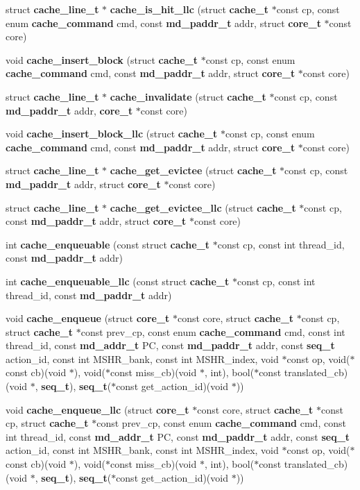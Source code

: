 \begin{CompactItemize}
\item 
struct {\bf cache\_\-line\_\-t} $\ast$ {\bf cache\_\-is\_\-hit\_\-llc} (struct {\bf cache\_\-t} $\ast$const cp, const enum {\bf cache\_\-command} cmd, const {\bf md\_\-paddr\_\-t} addr, struct {\bf core\_\-t} $\ast$const core)
\item 
void {\bf cache\_\-insert\_\-block} (struct {\bf cache\_\-t} $\ast$const cp, const enum {\bf cache\_\-command} cmd, const {\bf md\_\-paddr\_\-t} addr, struct {\bf core\_\-t} $\ast$const core)
\item 
struct {\bf cache\_\-line\_\-t} $\ast$ {\bf cache\_\-invalidate} (struct {\bf cache\_\-t} $\ast$const cp, const {\bf md\_\-paddr\_\-t} addr, {\bf core\_\-t} $\ast$const core)
\item 
void {\bf cache\_\-insert\_\-block\_\-llc} (struct {\bf cache\_\-t} $\ast$const cp, const enum {\bf cache\_\-command} cmd, const {\bf md\_\-paddr\_\-t} addr, struct {\bf core\_\-t} $\ast$const core)
\item 
struct {\bf cache\_\-line\_\-t} $\ast$ {\bf cache\_\-get\_\-evictee} (struct {\bf cache\_\-t} $\ast$const cp, const {\bf md\_\-paddr\_\-t} addr, struct {\bf core\_\-t} $\ast$const core)
\item 
struct {\bf cache\_\-line\_\-t} $\ast$ {\bf cache\_\-get\_\-evictee\_\-llc} (struct {\bf cache\_\-t} $\ast$const cp, const {\bf md\_\-paddr\_\-t} addr, struct {\bf core\_\-t} $\ast$const core)
\item 
int {\bf cache\_\-enqueuable} (const struct {\bf cache\_\-t} $\ast$const cp, const int thread\_\-id, const {\bf md\_\-paddr\_\-t} addr)
\item 
int {\bf cache\_\-enqueuable\_\-llc} (const struct {\bf cache\_\-t} $\ast$const cp, const int thread\_\-id, const {\bf md\_\-paddr\_\-t} addr)
\item 
void {\bf cache\_\-enqueue} (struct {\bf core\_\-t} $\ast$const core, struct {\bf cache\_\-t} $\ast$const cp, struct {\bf cache\_\-t} $\ast$const prev\_\-cp, const enum {\bf cache\_\-command} cmd, const int thread\_\-id, const {\bf md\_\-addr\_\-t} PC, const {\bf md\_\-paddr\_\-t} addr, const {\bf seq\_\-t} action\_\-id, const int MSHR\_\-bank, const int MSHR\_\-index, void $\ast$const op, void($\ast$const cb)(void $\ast$), void($\ast$const miss\_\-cb)(void $\ast$, int), bool($\ast$const translated\_\-cb)(void $\ast$, {\bf seq\_\-t}), {\bf seq\_\-t}($\ast$const get\_\-action\_\-id)(void $\ast$))
\item 
void {\bf cache\_\-enqueue\_\-llc} (struct {\bf core\_\-t} $\ast$const core, struct {\bf cache\_\-t} $\ast$const cp, struct {\bf cache\_\-t} $\ast$const prev\_\-cp, const enum {\bf cache\_\-command} cmd, const int thread\_\-id, const {\bf md\_\-addr\_\-t} PC, const {\bf md\_\-paddr\_\-t} addr, const {\bf seq\_\-t} action\_\-id, const int MSHR\_\-bank, const int MSHR\_\-index, void $\ast$const op, void($\ast$const cb)(void $\ast$), void($\ast$const miss\_\-cb)(void $\ast$, int), bool($\ast$const translated\_\-cb)(void $\ast$, {\bf seq\_\-t}), {\bf seq\_\-t}($\ast$const get\_\-action\_\-id)(void $\ast$))

\end{CompactItemize}
